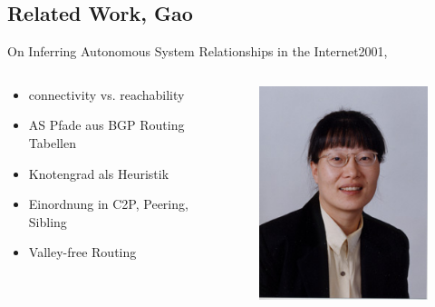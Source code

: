 \documentclass[ngerman,compress,hyperref={bookmarks}]{beamer}
\begin{document}
\subsection{Related Work, Gao}
\begin{frame}{On Inferring Autonomous System Relationships in the Internet}{2001, \cite{Gao:2001:IAS:504611.504616}}
  \begin{columns}[c]
    \begin{column}{0.5\textwidth}
      \begin{itemize}
        \item connectivity vs. reachability
        \item AS Pfade aus BGP Routing Tabellen
        \item Knotengrad als Heuristik
        \item Einordnung in C2P, Peering, Sibling
        \item Valley-free Routing
      \end{itemize}
    \end{column}
    \begin{column}{0.1\textwidth}
      \begin{figure}
        \includegraphics[width=1\textwidth]{images/gao}

\end{figure}
\end{column}
\end{columns}
\end{frame}
\end{document}
